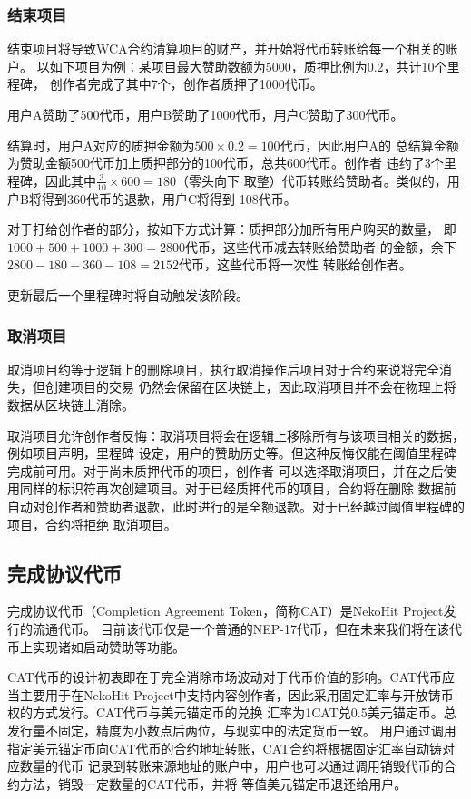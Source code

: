 \subsubsection{结束项目}

结束项目将导致WCA合约清算项目的财产，并开始将代币转账给每一个相关的账户。
以如下项目为例：某项目最大赞助数额为5000，质押比例为0.2，共计10个里程碑，
创作者完成了其中7个，创作者质押了1000代币。

用户A赞助了500代币，用户B赞助了1000代币，用户C赞助了300代币。

结算时，用户A对应的质押金额为$500 \times 0.2 = 100$代币，因此用户A的
总结算金额为赞助金额500代币加上质押部分的100代币，总共600代币。创作者
违约了3个里程碑，因此其中$\frac{3}{10} \times 600 = 180$（零头向下
取整）代币转账给赞助者。类似的，用户B将得到360代币的退款，用户C将得到
108代币。

对于打给创作者的部分，按如下方式计算：质押部分加所有用户购买的数量，
即$1000 + 500 + 1000 + 300 = 2800$代币，这些代币减去转账给赞助者
的金额，余下$2800 - 180 - 360 - 108 = 2152$代币，这些代币将一次性
转账给创作者。

更新最后一个里程碑时将自动触发该阶段。

\subsubsection{取消项目}

取消项目约等于逻辑上的删除项目，执行取消操作后项目对于合约来说将完全消失，但创建项目的交易
仍然会保留在区块链上，因此取消项目并不会在物理上将数据从区块链上消除。

取消项目允许创作者反悔：取消项目将会在逻辑上移除所有与该项目相关的数据，例如项目声明，里程碑
设定，用户的赞助历史等。但这种反悔仅能在阈值里程碑完成前可用。对于尚未质押代币的项目，创作者
可以选择取消项目，并在之后使用同样的标识符再次创建项目。对于已经质押代币的项目，合约将在删除
数据前自动对创作者和赞助者退款，此时进行的是全额退款。对于已经越过阈值里程碑的项目，合约将拒绝
取消项目。

\subsection{完成协议代币}\label{subsec:cat}

完成协议代币（Completion Agreement Token，简称CAT）是NekoHit Project发行的流通代币。
目前该代币仅是一个普通的NEP-17代币，但在未来我们将在该代币上实现诸如启动赞助等功能。

CAT代币的设计初衷即在于完全消除市场波动对于代币价值的影响。CAT代币应当主要用于在NekoHit
Project中支持内容创作者，因此采用固定汇率与开放铸币权的方式发行。CAT代币与美元锚定币的兑换
汇率为1CAT兑0.5美元锚定币。总发行量不固定，精度为小数点后两位，与现实中的法定货币一致。
用户通过调用指定美元锚定币向CAT代币的合约地址转账，CAT合约将根据固定汇率自动铸对应数量的代币
记录到转账来源地址的账户中，用户也可以通过调用销毁代币的合约方法，销毁一定数量的CAT代币，并将
等值美元锚定币退还给用户。

